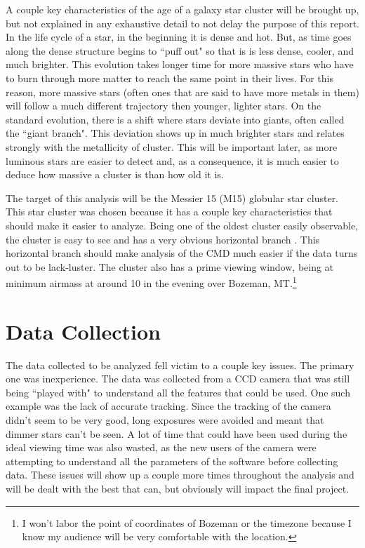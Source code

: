 \documentclass[twoside,11pt]{article}
\begin{document}
A couple key characteristics of the age of a galaxy star cluster will be brought up, but not explained in any exhaustive detail to not delay the purpose of this report. In the life cycle of a star, in the beginning it is dense and hot. But, as time goes along the dense structure begins to ``puff out" so that is is less dense, cooler, and much brighter. This evolution takes longer time for more massive stars who have to burn through more matter to reach the same point in their lives. For this reason, more massive stars (often ones that are said to have more metals in them) will follow a much different trajectory then younger, lighter stars. On the standard evolution, there is a shift where stars deviate into giants, often called the ``giant branch". This deviation shows up in much brighter stars and relates strongly with the metallicity of cluster. This will be important later, as more luminous stars are easier to detect and, as a consequence, it is much easier to deduce how massive a cluster is than how old it is. 

The target of this analysis will be the Messier 15 (M15) globular star cluster. This star cluster was chosen because it has a couple key characteristics that should make it easier to analyze. Being one of the oldest cluster easily observable, the cluster is easy to see and has a very obvious horizontal branch \citep{wiki}. This horizontal branch should make analysis of the CMD much easier if the data turns out to be lack-luster. The cluster also has a prime viewing window, being at minimum airmass at around 10 in the evening over Bozeman, MT.\footnote{I won't labor the point of coordinates of Bozeman or the timezone because I know my audience will be very comfortable with the location.} 

\section{Data Collection}
The data collected to be analyzed fell victim to a couple key issues. The primary one was inexperience. The data was collected from a CCD camera that was still being ``played with" to understand all the features that could be used. One such example was the lack of accurate tracking. Since the tracking of the camera didn't seem to be very good, long exposures were avoided and meant that dimmer stars can't be seen. A lot of time that could have been used during the ideal viewing time was also wasted, as the new users of the camera were attempting to understand all the parameters of the software before collecting data. These issues will show up a couple more times throughout the analysis and will be dealt with the best that can, but obviously will impact the final project.
\end{document}
